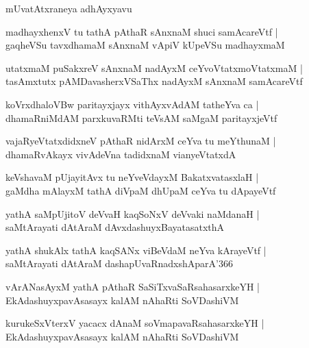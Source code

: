 \documentclass[twoside,12pt,openright]{book}
\newcounter{shloka}[chapter]
\begin{document}
\begin{center}
mUvatAtxraneya adhAyxyavu
\end{center}

\begin{shloka}%
madhayxhenxV tu tathA pAthaR sAnxnaM shuci samAcareVtf |\\
gaqheVSu tavxdhamaM sAnxnaM vApiV kUpeVSu madhayxmaM 
\end{shloka}

\begin{shloka}%
utatxmaM puSakxreV sAnxnaM nadAyxM ceYvoVtatxmoVtatxmaM |\\
tasAmxtutx pAMDavasherxVSaThx nadAyxM sAnxnaM samAcareVtf
\end{shloka}

\begin{shloka}%
koVrxdhaloVBw paritayxjayx vithAyxvAdAM tatheYva ca |\\
dhamaRniMdAM parxkuvaRMti teVsAM saMgaM paritayxjeVtf
\end{shloka}

\begin{shloka}%
vajaRyeVtatxdidxneV pAthaR nidArxM ceYva tu meYthunaM |\\
dhamaRvAkayx vivAdeVna tadidxnaM vianyeVtatxdA
\end{shloka}

\begin{shloka}%
keVshavaM pUjayitAvx tu neYveVdayxM BakatxvatasxlaH |\\
gaMdha mAlayxM tathA diVpaM dhUpaM ceYva tu dApayeVtf
\end{shloka}

\begin{shloka}%
yathA saMpUjitoV deVvaH kaqSoNxV deVvaki naMdanaH |\\
saMtArayati dAtAraM dAvxdashuyxBayatasatxthA 
\end{shloka}

\begin{shloka}%
yathA shukAlx tathA kaqSANx viBeVdaM neYva kArayeVtf |\\
saMtArayati dAtAraM dashapUvaRnadxshAparA\char'366
\end{shloka}

\begin{shloka}%
vArANasAyxM yathA pAthaR SaSiTxvaSaRsahasarxkeYH |\\
EkAdashuyxpavAsasayx kalAM nAhaRti SoVDashiVM 
\end{shloka}

\begin{shloka}%
kurukeSxVterxV yacacx dAnaM soVmapavaRsahasarxkeYH |\\
EkAdashuyxpavAsasayx kalAM nAhaRti SoVDashiVM
\end{shloka}
\end{document}
